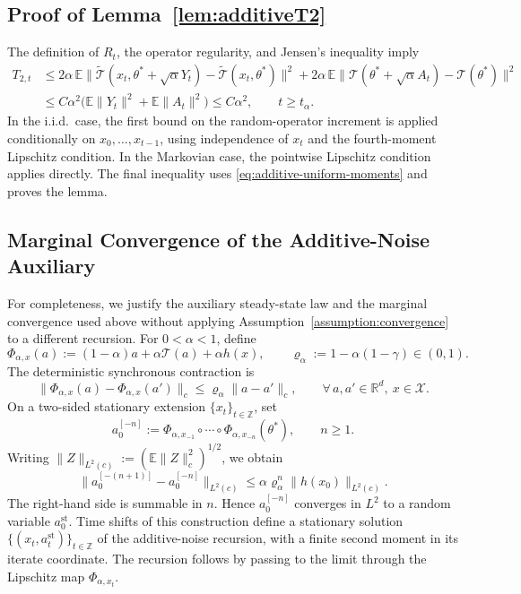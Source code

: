 \documentclass[11pt,letterpaper]{article}
\theoremstyle{plain}
\theoremstyle{definition}
\theoremstyle{remark}
\newcommand{\E}{\mathbb{E}}
\newcommand{\mT}{\mathcal{T}}
\newcommand{\R}{\mathbb{R}}
\newcommand{\tmT}{\widetilde{\mT}}
\begin{document}
\subsection{Proof of Lemma~\ref{lem:additiveT2}}
\label{sec:proof-additiveT2}
The definition of $R_t$, the operator regularity, and Jensen's
inequality imply
\begin{align*}
    T_{2,t}
    &\leq2\alpha\,
        \E\|\tmT(x_t,\theta^*+\sqrt\alpha Y_t)-\tmT(x_t,\theta^*)\|^2
       +2\alpha\,
        \E\|\mT(\theta^*+\sqrt\alpha A_t)-\mT(\theta^*)\|^2\\
    &\leq C\alpha^2\bigl(\E\|Y_t\|^2+\E\|A_t\|^2\bigr)
    \leq C\alpha^2,
    \qquad t\geq t_\alpha.
\end{align*}
In the i.i.d.\ case, the first bound on the random-operator increment is
applied conditionally on $x_0,\ldots,x_{t-1}$, using independence of
$x_t$ and the fourth-moment Lipschitz condition. In the Markovian case,
the pointwise Lipschitz condition applies directly. The final inequality
uses \eqref{eq:additive-uniform-moments} and proves the lemma.

\subsection{Marginal Convergence of the Additive-Noise Auxiliary}
\label{sec:additive-marginal-convergence}
For completeness, we justify the auxiliary steady-state law and the
marginal convergence used above without applying
Assumption~\ref{assumption:convergence} to a different recursion.
For $0<\alpha<1$, define
\[
    \Phi_{\alpha,x}(a)
    :=(1-\alpha)a+\alpha\mT(a)+\alpha h(x),
    \qquad \varrho_\alpha:=1-\alpha(1-\gamma)\in(0,1).
\]
The deterministic synchronous contraction is
\begin{equation}
\label{eq:additive-synchronous-contraction}
    \|\Phi_{\alpha,x}(a)-\Phi_{\alpha,x}(a')\|_c
    \leq\varrho_\alpha\|a-a'\|_c,
    \qquad \forall\,a,a'\in\R^d,\ x\in\mathcal X.
\end{equation}
On a two-sided stationary extension $\{x_t\}_{t\in\mathbb Z}$, set
\[
    a_0^{[-n]}
    :=\Phi_{\alpha,x_{-1}}\circ\cdots\circ
        \Phi_{\alpha,x_{-n}}(\theta^*),
    \qquad n\geq1.
\]
Writing $\|Z\|_{L^2(c)}:=(\E\|Z\|_c^2)^{1/2}$, we obtain
\[
    \|a_0^{[-(n+1)]}-a_0^{[-n]}\|_{L^2(c)}
    \leq\alpha\varrho_\alpha^n\|h(x_0)\|_{L^2(c)}.
\]
The right-hand side is summable in $n$. Hence $a_0^{[-n]}$ converges in
$L^2$ to a random variable $a_0^{\mathrm{st}}$. Time shifts of this
construction define a stationary solution
$\{(x_t,a_t^{\mathrm{st}})\}_{t\in\mathbb Z}$ of the additive-noise
recursion, with a finite second moment in its iterate coordinate.
The recursion follows by passing to the limit through the Lipschitz
map $\Phi_{\alpha,x_t}$.
\end{document}
